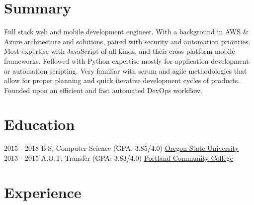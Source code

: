 \documentclass[letterpaper]{twentysecondcv} %
\begin{document}
\makeprofile %


\section{Summary}
    Full stack web and mobile development engineer. With a background in AWS \& Azure architecture and solutions, paired with security and automation priorities. 
    \newline \newline 
    Most expertise with JavaScript of all kinds, and their cross platform mobile frameworks. Followed with Python expertise mostly for application development or automation scripting.
    \newline \newline
    Very familiar with scrum and agile methodologies that allow for proper planning and quick iterative development cycles of products. Founded upon an efficient and fast automated DevOps workflow. 
\section{Education}

\begin{twenty} %
	\twentyitem
    	{2015 - 2018 }
        {}
        {  B.S, Computer Science \textnormal{(GPA: 3.85/4.0)}}
        {\href{http://www.oregonstate.edu/}{Oregon State University}}
        {}
        {}
	\twentyitem
    	{2013 - 2015}
		{}
        {  A.O.T, Transfer \textnormal{(GPA: 3.83/4.0)}}
        {\href{https://www.pcc.edu/}{Portland Community College}}
        {}
        {}
\end{twenty}


\section{Experience}
\end{document}
